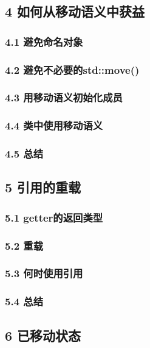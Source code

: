 \documentclass[11pt,a4paper,UTF8]{ctexart}
\begin{document}
	\subsection{4 如何从移动语义中获益}
	
		\subsubsection{4.1 避免命名对象}
		
		\subsubsection{4.2 避免不必要的std::move()}
		
		\subsubsection{4.3 用移动语义初始化成员}
		
		\subsubsection{4.4 类中使用移动语义}
		
		\subsubsection{4.5 总结}
		
	\subsection{5 引用的重载}
	
		\subsubsection{5.1 getter的返回类型}
		
		\subsubsection{5.2 重载}
		
		\subsubsection{5.3 何时使用引用}
		
		\subsubsection{5.4 总结}
		
	\subsection{6 已移动状态}
	
\end{document}

